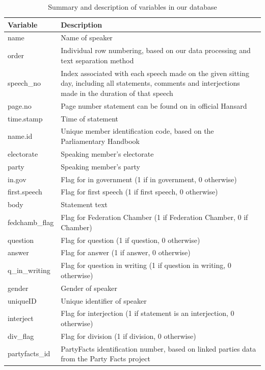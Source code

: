 \documentclass[
  letterpaper,
  DIV=11,
  numbers=noendperiod]{scrartcl}
\begin{document}
\hypertarget{tbl-vars}{}
\begin{table}[H]
\caption{\label{tbl-vars}Summary and description of variables in our database }\tabularnewline

\centering
\begin{tabular}{>{\raggedright\arraybackslash}p{8em}>{\raggedright\arraybackslash}p{30em}}
\toprule
Variable & Description\\
\midrule
name & Name of speaker\\
order & Individual row numbering, based on our data processing and text separation method\\
speech\_no & Index associated with each speech made on the given sitting day, including all statements, comments and interjections made in the duration of that speech\\
page.no & Page number statement can be found on in official Hansard\\
time.stamp & Time of statement\\
\addlinespace
name.id & Unique member identification code, based on the Parliamentary Handbook\\
electorate & Speaking member's electorate\\
party & Speaking member's party\\
in.gov & Flag for in government (1 if in government, 0 otherwise)\\
first.speech & Flag for first speech (1 if first speech, 0 otherwise)\\
\addlinespace
body & Statement text\\
fedchamb\_flag & Flag for Federation Chamber (1 if Federation Chamber, 0 if Chamber)\\
question & Flag for question (1 if question, 0 otherwise)\\
answer & Flag for answer (1 if answer, 0 otherwise)\\
q\_in\_writing & Flag for question in writing (1 if question in writing, 0 otherwise)\\
\addlinespace
gender & Gender of speaker\\
uniqueID & Unique identifier of speaker\\
interject & Flag for interjection (1 if statement is an interjection, 0 otherwise)\\
div\_flag & Flag for division (1 if division, 0 otherwise)\\
partyfacts\_id & PartyFacts identification number, based on linked parties data from the Party Facts project\\
\bottomrule
\end{tabular}
\end{table}
\end{document}
